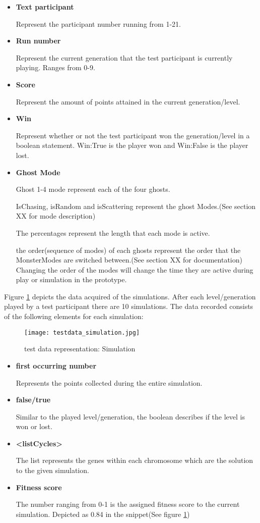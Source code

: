 \begin{itemize}
\item  \textbf{Text participant}

Represent the participant number running from 1-21.
\item  \textbf{Run number}

Represent the current generation that the test participant is currently playing. Ranges from 0-9.
\item  \textbf{Score}

Represent the amount of points attained in the current generation/level.
\item  \textbf{Win}

Represent whether or not the test participant won the generation/level in a boolean statement. Win:True is the player won and Win:False is the player lost.
\item  \textbf{Ghost Mode}

Ghost 1-4 mode represent each of the four ghosts.


IsChasing, isRandom and isScattering represent the ghost Modes.(See section XX for mode description)

The percentages represent the length that each mode is active.

the order(sequence of modes) of each ghosts represent the order that the MonsterModes are switched between.(See section XX for documentation) Changing the order of the modes will change the time they are active during play or simulation in the prototype.
\end{itemize}

\newpage
Figure \ref{fig:testdata_simulation} depicts the data acquired of the simulations. After each level/generation played by a test participant there are 10 simulations.
The data recorded consists of the following elements for each simulation:

\begin{figure}[!htbp]
\centering
\texttt{[image: testdata\_simulation.jpg]}
\caption{test data representation: Simulation}
\label{fig:testdata_simulation}
\end{figure}

\begin{itemize}
\item \textbf{first occurring number}

Represents the points collected during the entire simulation.

\item  \textbf{false/true}

Similar to the played level/generation, the boolean describes if the level is won or lost.

\item \textbf{<listCycles>}

The list represents the genes within each chromosome which are the solution to the given simulation.

\item \textbf{Fitness score}

The number ranging from 0-1 is the assigned fitness score to the current simulation. Depicted as 0.84 in the snippet(See figure \ref{fig:testdata_simulation})
\end{itemize}
\newpage
